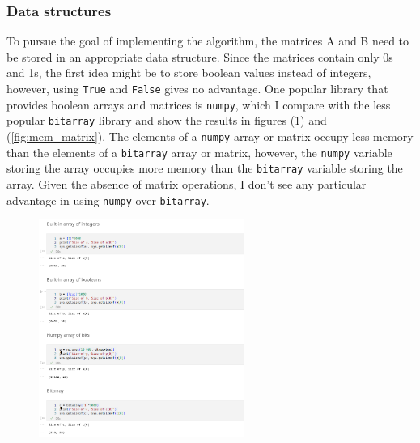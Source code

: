 \documentclass{beamer}
\begin{document}
\begin{frame}
    \frametitle{Data structures}

    To pursue the goal of implementing the algorithm, the matrices A and B need
    to be stored in an appropriate data structure. Since the matrices contain
    only 0s and 1s, the first idea might be to store boolean values instead
    of integers, however, using 
    \texttt{True} and \texttt{False} gives no advantage.
    One popular library that provides boolean arrays and matrices is
    \texttt{numpy}, which I compare with the less popular \texttt{bitarray}
    library and show the results in figures (\ref{fig:mem_array}) and 
    (\ref{fig:mem_matrix}).
    The elements of a \texttt{numpy} array or matrix occupy less memory than
    the elements of a \texttt{bitarray} array or matrix, however,
    the \texttt{numpy} variable storing the array occupies more memory 
    than the \texttt{bitarray} variable storing the array.
    Given the absence of matrix operations, I don't see any 
    particular advantage in using \texttt{numpy} over \texttt{bitarray}.
    
\end{frame}

\begin{frame}
        \begin{figure}
            \centering
            \includegraphics[width=0.6\textwidth]{mem_array.png}
            \label{fig:mem_array}
        \end{figure}
\end{frame}
\end{document}
